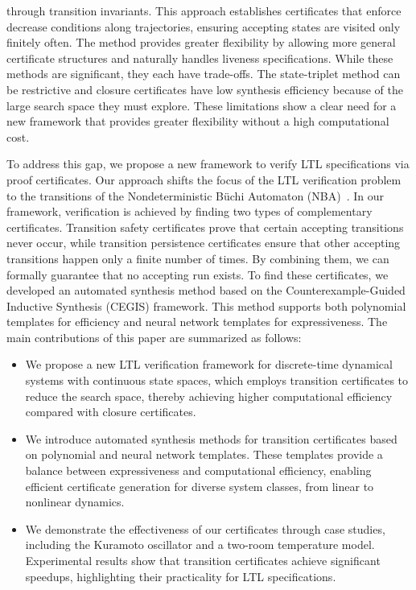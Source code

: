 through transition invariants. This approach establishes certificates that enforce decrease conditions along trajectories, ensuring accepting states are visited only finitely often. The method provides greater flexibility by allowing more general certificate structures and naturally handles liveness specifications. While these methods are significant, they each have trade-offs. The state-triplet method can be restrictive and closure certificates have low synthesis efficiency because of the large search space they must explore. These limitations show a clear need for a new framework that provides greater flexibility without a high computational cost.

To address this gap, we propose a new framework to verify LTL specifications via proof certificates. Our approach shifts the focus of the LTL verification problem to the transitions of the Nondeterministic Büchi Automaton (NBA)~\cite{hahn2020reward}. In our framework, verification is achieved by finding two types of complementary certificates. Transition safety certificates prove that certain accepting transitions never occur, while transition persistence certificates ensure that other accepting transitions happen only a finite number of times. By combining them, we can formally guarantee that no accepting run exists. To find these certificates, we developed an automated synthesis method based on the Counterexample-Guided Inductive Synthesis (CEGIS) framework. This method supports both polynomial templates for efficiency and neural network templates for expressiveness. The main contributions of this paper are summarized as follows:
\begin{itemize}

  \item We propose a new LTL verification framework for discrete-time dynamical systems with continuous state spaces, which employs transition certificates to reduce the search space, thereby achieving higher computational efficiency compared with closure certificates.
  

  \item We introduce automated synthesis methods for transition certificates based on polynomial and neural network templates. These templates provide a balance between expressiveness and computational efficiency, enabling efficient certificate generation for diverse system classes, from linear to nonlinear dynamics.
  

  \item We demonstrate the effectiveness of our certificates through case studies, including the Kuramoto oscillator and a two-room temperature model. Experimental results show that transition certificates achieve significant speedups, highlighting their practicality for LTL specifications.
\end{itemize}

